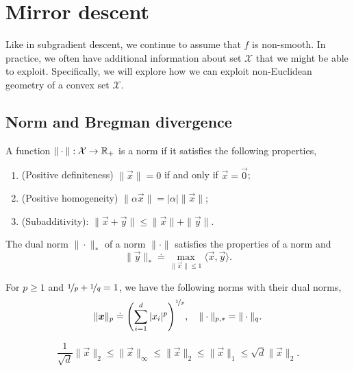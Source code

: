 \section{Mirror descent}

Like in subgradient descent, we continue to assume that $f$ is non-smooth. In practice, we often
have additional information about set $\mathcal{X}$ that we might be able to exploit. Specifically,
we will explore how we can exploit non-Euclidean geometry of a convex set
$\mathcal{X}$.

\subsection{Norm and Bregman divergence}

\begin{definition}[Norm]
    A function $\| \cdot \|: \mathcal{X} \to \mathbb{R}_+$ is a norm if it satisfies the following properties,
    \begin{enumerate}
        \item (Positive definiteness) $\| \vec{x} \| = 0$ if and only if $\vec{x} = \vec{0}$;
        \item (Positive homogeneity) $\| \alpha \vec{x} \| = |\alpha| \| \vec{x} \|$;
        \item (Subadditivity): $\| \vec{x} + \vec{y} \| \leq \| \vec{x} \| + \| \vec{y} \|$.
    \end{enumerate}
\end{definition}

\begin{definition}
    The dual norm $\| \cdot \|_*$ of a norm $\| \cdot \|$ satisfies the properties of a norm and \[
        \| \vec{y} \|_* \doteq \max_{\| \vec{x} \| \leq 1} \langle \vec{x}, \vec{y} \rangle.
    \]
\end{definition}

\begin{example}
    For $p \geq 1$ and $\nicefrac{1}{p} + \nicefrac{1}{q} = 1$, we have the following norms with their dual norms, \[
        \| \vec{x} \|_p \doteq \lft( \sum_{i=1}^{d} |x_i|^p \rgt)^{\nicefrac{1}{p}}, \quad \| \cdot \|_{p,*} = \| \cdot \|_q.
    \]
\end{example}

\begin{lemma}
    \[
        \frac{1}{\sqrt{d}} \| \vec{x} \|_2 \leq \| \vec{x} \|_\infty \leq \| \vec{x} \|_2 \leq \| \vec{x} \|_1 \leq \sqrt{d} \| \vec{x} \|_2.
    \]
\end{lemma}

